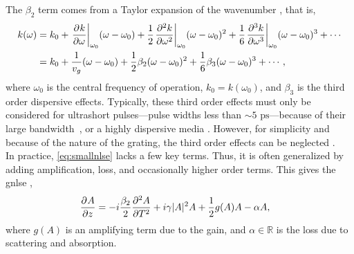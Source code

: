 The $\beta_2$ term comes from a Taylor expansion of the wavenumber \cite{kartner}, that is,
\begin{align*}
k(\omega) &= k_0 + \left. \pdiff{k}{\omega}\right|_{\omega_0}(\omega - \omega_0) + \frac{1}{2} \left. \pdiff[2]{k}{\omega}\right|_{\omega_0}(\omega - \omega_0)^2 + \frac{1}{6} \left. \pdiff[3]{k}{\omega}\right|_{\omega_0}(\omega - \omega_0)^3 + \cdots \\
&= k_0 + \frac{1}{v_g}(\omega - \omega_0) + \frac{1}{2}\beta_2 (\omega - \omega_0)^2 + \frac{1}{6}\beta_3 (\omega - \omega_0)^3 + \cdots,
\end{align*}
where $\omega_0$ is the central frequency of operation, $k_0 = k(\omega_0)$, and $\beta_3$ is the third order dispersive effects. Typically, these third order effects must only be considered for ultrashort pulses---pulse widths less than $\sim5 \text{ ps}$---because of their large bandwidth~\cite{agrawal2013}, or a highly dispersive media \cite{agrawal2013, litchinitser}. However, for simplicity and because of the nature of the grating, the third order effects can be neglected \cite{agrawal2013, ferreira}. \\

In practice, \eqref{eq:smallnlse} lacks a few key terms. Thus, it is often generalized by adding amplification, loss, and occasionally higher order terms. This gives the \gls{gnlse} \cite{agrawal2013, bohun, finot, peng, shtyrina, yarutkina},
\begin{align}
\label{eq:nlse}
\pdiff{A}{z} &= - i \frac{\beta_2}{2}\pdiff[2]{A}{T} + i \gamma |A|^2 A + \frac{1}{2}g(A) A - \alpha A,
\end{align}
where $g(A)$ is an amplifying term due to the gain, and $\alpha \in \mathbb{R}$ is the loss due to scattering and absorption. \\


